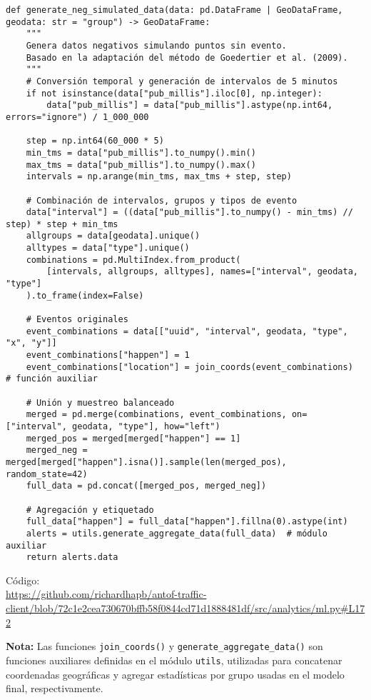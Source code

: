 \documentclass[12pt]{article}
\begin{document}
\begin{verbatim}
def generate_neg_simulated_data(data: pd.DataFrame | GeoDataFrame, geodata: str = "group") -> GeoDataFrame:
    """
    Genera datos negativos simulando puntos sin evento.
    Basado en la adaptación del método de Goedertier et al. (2009).
    """
    # Conversión temporal y generación de intervalos de 5 minutos
    if not isinstance(data["pub_millis"].iloc[0], np.integer):
        data["pub_millis"] = data["pub_millis"].astype(np.int64, errors="ignore") / 1_000_000

    step = np.int64(60_000 * 5)
    min_tms = data["pub_millis"].to_numpy().min()
    max_tms = data["pub_millis"].to_numpy().max()
    intervals = np.arange(min_tms, max_tms + step, step)

    # Combinación de intervalos, grupos y tipos de evento
    data["interval"] = ((data["pub_millis"].to_numpy() - min_tms) // step) * step + min_tms
    allgroups = data[geodata].unique()
    alltypes = data["type"].unique()
    combinations = pd.MultiIndex.from_product(
        [intervals, allgroups, alltypes], names=["interval", geodata, "type"]
    ).to_frame(index=False)

    # Eventos originales
    event_combinations = data[["uuid", "interval", geodata, "type", "x", "y"]]
    event_combinations["happen"] = 1
    event_combinations["location"] = join_coords(event_combinations)  # función auxiliar

    # Unión y muestreo balanceado
    merged = pd.merge(combinations, event_combinations, on=["interval", geodata, "type"], how="left")
    merged_pos = merged[merged["happen"] == 1]
    merged_neg = merged[merged["happen"].isna()].sample(len(merged_pos), random_state=42)
    full_data = pd.concat([merged_pos, merged_neg])

    # Agregación y etiquetado
    full_data["happen"] = full_data["happen"].fillna(0).astype(int)
    alerts = utils.generate_aggregate_data(full_data)  # módulo auxiliar
    return alerts.data
\end{verbatim}

Código: \\
\url{https://github.com/richardhapb/antof-traffic-client/blob/72c1e2cea730670bffb58f0844cd71d1888481df/src/analytics/ml.py#L172}

\noindent\textbf{Nota:}
Las funciones \texttt{join\_coords()} y \texttt{generate\_aggregate\_data()} son funciones auxiliares definidas en el módulo \texttt{utils}, utilizadas para concatenar coordenadas geográficas y agregar estadísticas por grupo usadas en el modelo final, respectivamente.
\end{document}
